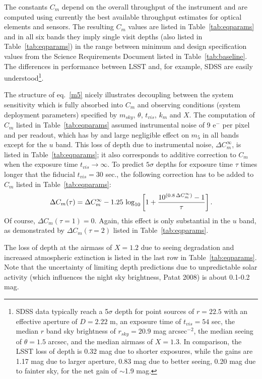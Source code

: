The constants $C_m$ depend on the overall throughput of the instrument
and are computed using currently the best available throughput estimates for
optical elements and sensors. The resulting $C_m$ values are listed in Table~\ref{tab:eqparams}
and in all six bands they imply single visit depths (also listed in Table~\ref{tab:eqparams}) in the range
between minimum and design specification values from the Science Requirements
Document listed in Table~\ref{tab:baseline}.
The differences in performance between LSST and, for example, SDSS are easily
understood\footnote{SDSS data
typically reach a 5$\sigma$ depth for point sources of $r=22.5$
with an effective aperture of $D=2.22$ m, an exposure time of $t_{vis}=54$
sec, the median $r$ band sky brightness of $r_{sky}=20.9$ mag arcsec$^{-2}$,
the median seeing of $\theta=1.5$ arcsec, and the median airmass of $X=1.3$.
In comparison, the LSST loss of depth is 0.32 mag due to shorter exposures,
while the gains are 1.17 mag due to larger aperture, 0.83 mag due to better
seeing, 0.20 mag due to fainter sky, for the net gain of $\sim$1.9 mag.}.

The structure of eq.~\ref{m5} nicely illustrates decoupling between the system
sensitivity which is fully absorbed into $C_m$ and observing conditions
(system deployment parameters) specified by $m_{sky}$, $\theta$, $t_{vis}$, $k_m$
and $X$. The computation of $C_m$ listed in Table~\ref{tab:eqparams} assumed instrumental noise of
9 e$^-$ per pixel and per readout, which has by and large negligible effect on $m_5$ in
all bands except for the $u$ band. This loss of depth due to instrumental noise, $\Delta C^{\infty}_m$,
is listed in Table~\ref{tab:eqparams}; it also corresponds to additive correction to $C_m$ when the
exposure time $t_{vis} \rightarrow \infty$. To predict $5\sigma$ depths for
exposure time $\tau$ times longer that the fiducial $t_{vis} = 30$ sec., the
following correction has to be added to $C_m$ listed in Table~\ref{tab:eqparams}:
\begin{equation}
\label{eq:DCm}
 \Delta C_m(\tau) = \Delta C^\infty_m - 1.25\,\log_{10}\left[1 + {10^{(0.8 \, \Delta C^\infty_m)} - 1 \over \tau}  \right].
\end{equation}
Of course, $\Delta C_m(\tau=1)=0$. Again, this effect is only substantial in the $u$
band, as demonstrated by $\Delta C_m(\tau = 2)$ listed in Table~\ref{tab:eqparams}.

The loss of depth at the airmass of $X=1.2$ due to seeing degradation
and increased atmospheric extinction is listed in the last row in Table~\ref{tab:eqparams}. Note
that the uncertainty of limiting depth predictions due to unpredictable solar
activity (which influences the night sky brightness, Patat 2008) is about
0.1-0.2 mag.




